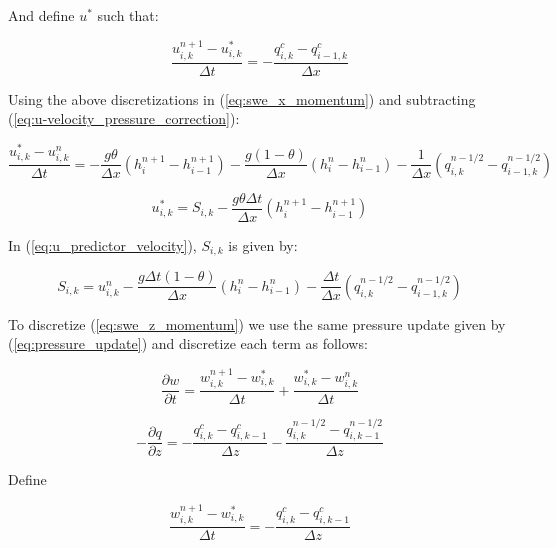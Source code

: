 \documentclass[12pt]{article}
\begin{document}
And define $u^*$ such that:

\begin{equation} \label{eq:u-velocity_pressure_correction}
\frac{u_{i,k}^{n+1} - u_{i,k}^*}{\Delta t} = -\frac{q_{i,k}^c - q_{i-1,k}^c}{\Delta x} 
\end{equation}

Using the above discretizations in (\ref{eq:swe_x_momentum}) and subtracting (\ref{eq:u-velocity_pressure_correction}):

\begin{equation*}
\frac{u_{i,k}^* - u_{i,k}^n}{\Delta t} = - \frac{g \theta}{\Delta x} (h_{i}^{n+1}-h_{i-1}^{n+1}) - \frac{g (1-\theta)}{\Delta x} (h_{i}^n - h_{i-1}^n) - \frac{1}{\Delta x} (q_{i,k}^{n-1/2} - q_{i-1,k}^{n-1/2})
\end{equation*}

\begin{equation} \label{eq:u_predictor_velocity}
u_{i,k}^* = S_{i,k} - \frac{g \theta \Delta t}{\Delta x} (h_{i}^{n+1} - h_{i-1}^{n+1})
\end{equation}

In (\ref{eq:u_predictor_velocity}), $S_{i,k}$ is given by:

\begin{equation*}
S_{i,k} = u_{i,k}^n - \frac{g \Delta t (1-\theta)}{\Delta x} (h_{i}^n - h_{i-1}^n) - \frac{\Delta t}{\Delta x} (q_{i,k}^{n-1/2} - q_{i-1,k}^{n-1/2})
\end{equation*}

To discretize (\ref{eq:swe_z_momentum}) we use the same pressure update given by (\ref{eq:pressure_update}) and discretize each term as follows:

\begin{equation*}
\frac{\partial w}{\partial t} = \frac{w_{i,k}^{n+1} - w_{i,k}^*}{\Delta t} + \frac{w_{i,k}^* - w_{i,k}^n}{\Delta t}
\end{equation*}

\begin{equation*}
- \frac{\partial q}{\partial z} = -\frac{q_{i,k}^c - q_{i,k-1}^c}{\Delta z} - \frac{q_{i,k}^{n-1/2} - q_{i,k-1}^{n-1/2}}{\Delta z}
\end{equation*}

Define

\begin{equation} \label{eq:w-velocity_pressure_correction}
\frac{w_{i,k}^{n+1} - w_{i,k}^*}{\Delta t} = -\frac{q_{i,k}^c - q_{i,k-1}^c}{\Delta z} 
\end{equation}
\end{document}
